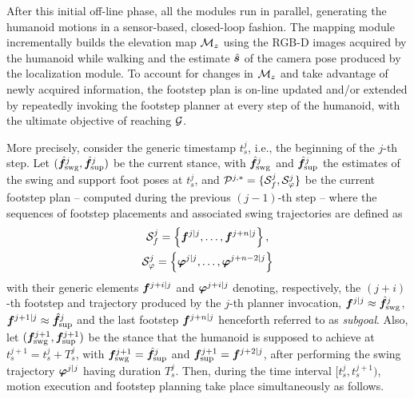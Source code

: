 After this initial off-line phase, all the modules run in parallel, generating
the humanoid motions in a sensor-based, closed-loop fashion.
%
The mapping module incrementally builds the elevation map ${\cal M}_z$ using
the RGB-D images acquired by the humanoid while walking and the estimate
$\hat{{\bm{s}}}$ of the camera pose produced by the localization module.
To account for changes in ${\cal M}_z$ and take advantage of newly acquired
information, the footstep plan is on-line updated and/or extended by repeatedly
invoking the footstep planner at every step of the humanoid, with the ultimate
objective of reaching $\cal G$. 

More precisely, consider the generic timestamp $t_s^j$, i.e., the beginning of
the $j$-th step.
Let $(\hat{{\bm{f}}}_{\rm swg}^{j}, \hat{{\bm{f}}}_{\rm sup}^{j})$ be the current
stance, with $\hat{{\bm{f}}}_{\rm swg}^{j}$ and $\hat{{\bm{f}}}_{\rm sup}^{j}$ the
estimates of the swing and support foot poses at $t_s^j$, and
${\cal P}^{j,*} = \{ {\cal S}_f^{j}, {\cal S}_\varphi^{j} \}$ be the current
footstep plan -- computed during the previous $(j-1)$-th step -- where the
sequences of footstep placements and associated swing trajectories are defined
as
\begin{gather*}
    {\cal S}_f^j = \left\{{\bm{f}}^{j|j}, \dots, {\bm{f}}^{j+n|j}\right\}, \\
    {\cal S}_\varphi^j = \left\{{\bm{\varphi}}^{j|j}, \dots, {\bm{\varphi}}^{j+n-2|j}\right\}
\end{gather*}
with their generic elements ${\bm{f}}^{j+i|j}$ and ${\bm{\varphi}}^{j+i|j}$ denoting,
respectively, the $(j+i)$-th footstep and trajectory produced by the $j$-th
planner invocation, ${\bm{f}}^{j|j} \approx \hat{{\bm{f}}}_{\rm swg}^{j}$,
${\bm{f}}^{j+1|j} \approx \hat{{\bm{f}}}_{\rm sup}^{j}$ and the last footstep
${\bm{f}}^{j+n|j}$ henceforth referred to as \textit{subgoal}.
Also, let $({\bm{f}}_{\rm swg}^{j+1}, {\bm{f}}_{\rm sup}^{j+1})$ be the stance that the
humanoid is supposed to achieve at $t_s^{j+1} = t_s^j + T_s^j$, with
${\bm{f}}_{\rm swg}^{j+1} = \hat{{\bm{f}}}_{\rm sup}^{j}$ and
${\bm{f}}_{\rm sup}^{j+1} = {\bm{f}}^{j+2|j}$, after performing the swing trajectory
${\bm{\varphi}}^{j|j}$ having duration $T_s^j$.
%
Then, during the time interval $[t_s^j, t_s^{j+1})$, motion execution and
footstep planning take place simultaneously as follows.
